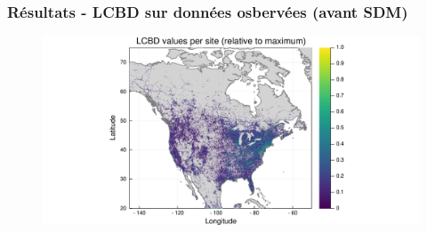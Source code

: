 \documentclass[10pt]{beamer}
\begin{document}
\begin{frame}
  \frametitle{Résultats - LCBD sur données osbervées (avant SDM)}
  \begin{figure}
    \centering
    \includegraphics[scale=0.4]{fig/pres-abs-ebd.pdf}
  \end{figure}
\end{frame}
\end{document}
